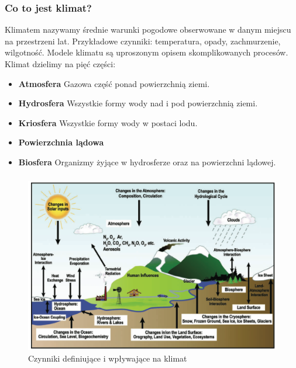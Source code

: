 \documentclass{beamer}
\begin{document}


\begin{frame}
\frametitle{Co to jest klimat?}
Klimatem nazywamy średnie warunki pogodowe obserwowane w danym miejscu na przestrzeni lat. Przykładowe czynniki: temperatura, opady, zachmurzenie, wilgotność.
Modele klimatu są uproszonym opisem skomplikowanych procesów.
Klimat dzielimy na pięć części:
\begin{itemize}
	\item \textbf{Atmosfera} Gazowa część ponad powierzchnią ziemi.
	\item \textbf{Hydrosfera} Wszystkie formy wody nad i pod powierzchnią ziemi.
	\item \textbf{Kriosfera} Wszystkie formy wody w postaci lodu.
	\item \textbf{Powierzchnia lądowa}
	\item \textbf{Biosfera} Organizmy żyjące w hydrosferze oraz na powierzchni lądowej.
\end{itemize}
\end{frame}


\begin{frame}
	\frametitle{}
	\begin{figure}[h]
		\begin{center}
			\includegraphics[width=0.7\linewidth]{images/Figure1}
			\caption{Czynniki definiujące i wpływające na klimat}
		\end{center}
	\end{figure}
\end{frame}
\end{document}
